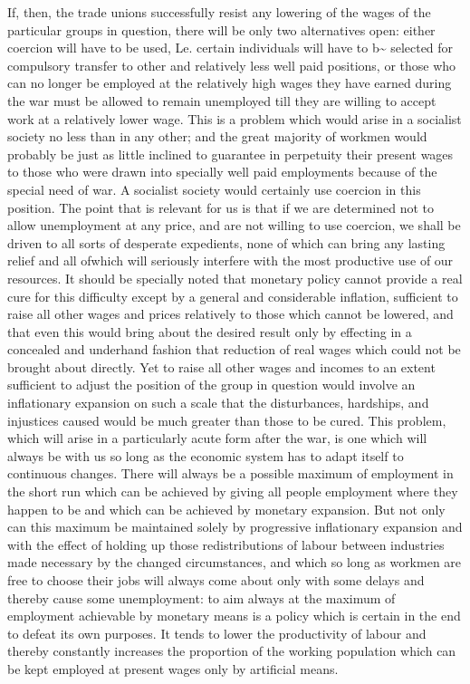 \documentclass[11pt,openany]{book}
\begin{document}
If, then, the trade unions successfully resist any lowering of the wages of the particular groups in question, there will be only two alternatives open: either coercion will have to be used, Le. certain individuals will have to b\textasciitilde{} selected for compulsory transfer to other and relatively less well paid positions, or those who can no longer be employed at the relatively high wages they have earned during the war must be allowed to remain unemployed till they are willing to accept work at a relatively lower wage. This is a problem which would arise in a socialist society no less than in any other; and the great majority of workmen would probably be just as little inclined to guarantee in perpetuity their present wages to those who were drawn into specially well paid employments because of the special need of war. A socialist society would certainly use coercion in this position. The point that is relevant for us is that if we are determined not to allow unemployment at any price, and are not willing to use coercion, we shall be driven to all sorts of desperate expedients, none of which can bring any lasting relief and all ofwhich will seriously interfere with the most productive use of our resources. It should be specially noted that monetary policy cannot provide a real cure for this difficulty except by a general and considerable inflation, sufficient to raise all other wages and prices relatively to those which cannot be lowered, and that even this would bring about the desired result only by effecting in a concealed and underhand fashion that reduction of real wages which could not be brought about directly. Yet to raise all other wages and incomes to an extent sufficient to adjust the position of the group in question would involve an inflationary expansion on such a scale that the disturbances, hardships, and injustices caused would be much greater than those to be cured. This problem, which will arise in a particularly acute form after the war, is one which will always be with us so long as the economic system has to adapt itself to continuous changes. There will always be a possible maximum of employment in the short run which can be achieved by giving all people employment where they happen to be and which can be achieved by monetary expansion. But not only can this maximum be maintained solely by progressive inflationary expansion and with the effect of holding up those redistributions of labour between industries made necessary by the changed circumstances, and which so long as workmen are free to choose their jobs will always come about only with some delays and thereby cause some unemployment: to aim always at the maximum of employment achievable by monetary means is a policy which is certain in the end to defeat its own purposes. It tends to lower the productivity of labour and thereby constantly increases the proportion of the working population which can be kept employed at present wages only by artificial means.
\end{document}
